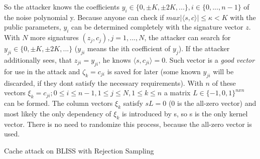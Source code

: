 So the attacker knows the coefficients $y_i \in \{0, \pm K, \pm 2K,...\}, i \in \{0,...,n-1\}$ of the noise polynomial y. Because anyone can check if $max|\langle s,c \rangle |\le \kappa < K$ with the public parameters, $y_i$ can be determined completely with the signature vector $z$. With $N$ more signatures $(z_j, c_j), j =1,...,N$, the attacker can search for  $y_{ji} \in \{0, \pm K, \pm 2K,...\}$ ($y_{ji}$ means the ith coefficient of $y_j$). If the attacker additionally sees, that $z_{ji} = y_{ji}$, he knows $\langle s, c_{ji} \rangle = 0$. Such vector is a \textit{good vector} for use in the attack and $\zeta _k = c_{ji}$ is saved for later (some known $y_{ji}$ will be discarded, if they dont satisfy the necessary requirements). With $n$ of these vectors $\xi _k = c_{ji}; 0 \le i \le n-1, 1 \le j \le N, 1\le k \le n$ a matrix $L \in \{-1,0,1\}^{nxn}$ can be formed. The column vectors $\xi_k$ satisfy $sL = 0$ (0 is the all-zero vector) and most likely the only dependency of $\xi_k$ is introduced by s, so s is the only kernel vector. There is no need to randomize this process, because the all-zero vector is used.

\begin{algorithm}
	\caption{Cache attack on BLISS with Rejection Sampling}
	\label{algrctattack}
	\begin{algorithmic}[1]
				\EndIf
			\EndFor
		\EndWhile
			\State{}
		\EndFor
	\end{algorithmic}
\end{algorithm}   

